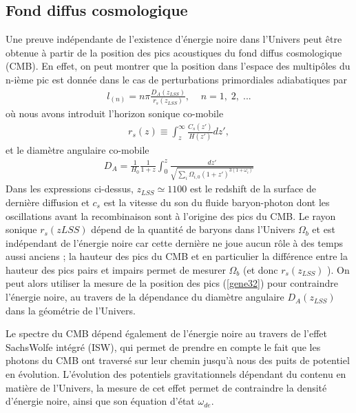 \documentclass[a4paper,12pt]{report}
\theoremstyle{plain}
\theoremstyle{plain}
\begin{document}
 \subsection{Fond diffus cosmologique}
 
 Une preuve ind\'ependante de l'existence d'\'energie noire dans l'Univers peut \^etre obtenue
\`a partir de la position des pics acoustiques du fond diffus cosmologique (CMB). En effet,
on peut montrer \cite{215} que la position dans l'espace des multip\^oles du n-i\`eme pic est donn\'ee
dans le cas de perturbations primordiales adiabatiques par
\begin{eqnarray}
  l_{(n)} = n \pi \frac{D_A(z_{LSS})}{r_s (z_{LSS}) }, \;\;\;\; n = 1, \; 2, \; ... \label{gene32}
\end{eqnarray}
o\`u nous avons introduit l'horizon sonique co-mobile
\begin{eqnarray}
 r_s(z) \equiv \int_z^{\infty } \frac{C_s(z')}{H(z') }dz', \label{gene33}
\end{eqnarray}
et le diam\`etre angulaire co-mobile
\begin{eqnarray}
 D_A = \frac{1}{H_0} \frac{1}{1+z} \int_0^z \frac{dz'}{\sqrt{ \sum_{i}  \Omega_{i,0}(1+z')^{3(1 + \omega_i) }}} \label{gene34}
\end{eqnarray}
Dans les expressions ci-dessus, $z_{LSS} \simeq  1100 $ est le redshift de la surface de derni\`ere 
diffusion  et $c_s$ est la vitesse du son du fluide baryon-photon dont les oscillations avant la
recombinaison sont \`a l'origine des pics du CMB. Le rayon sonique $ r_s(z{LSS})$ d\'epend de
la quantit\'e de baryons dans l'Univers $ \Omega_b $ et est ind\'ependant de l'\'energie noire car cette
derni\`ere ne joue aucun r\^ole \`a des temps aussi anciens ; la hauteur des pics du CMB et en
particulier la diff\'erence entre la hauteur des pics pairs et impairs permet de mesurer $ \Omega_b $
(et donc $ r_s (z_{LSS} )$ ). On peut alors utiliser la mesure de la position des pics (\ref{gene32}) pour
contraindre l'\'energie noire, au travers de la d\'ependance du diam\`etre angulaire $ D_A(z_{LSS} )$
dans la g\'eom\'etrie de l'Univers.

Le spectre du CMB d\'epend \'egalement de l'\'energie noire au travers de l'effet 
SachsWolfe int\'egr\'e (ISW), qui permet de prendre en compte le fait que les photons du CMB ont
travers\'e sur leur chemin jusqu'\`a nous des puits de potentiel en \'evolution. L'\'evolution des
potentiels gravitationnels d\'ependant du contenu en mati\`ere de l'Univers, la mesure de cet
effet permet de contraindre la densit\'e d'\'energie noire, ainsi que son \'equation d'\'etat $ \omega_{de} $.
\end{document}
